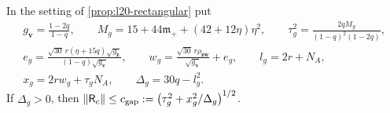 \begin{proposition}\label{prop:l20-pair-gap}
In the setting of \cref{prop:l20-rectangular} put
\begin{gather*}
 g_{\mathbf v}=\frac{1-2q}{1-q},\qquad
 M_g=15+44\mathfrak m_++(42+12\eta)\eta^2,\qquad
 \tau_g^2=\frac{2qM_g}{(1-q)^2(1-2q)},\\
 e_g=\frac{\sqrt{30}\,r(\eta+15q)\sqrt{g_{\mathbf z}}}{(1-q)\sqrt{g_{\mathbf v}}},\qquad
 w_g=\frac{\sqrt{30}\,r\rho_{\mathbf z\mathbf w}}{\sqrt{g_{\mathbf v}}}+e_g,\qquad
 l_g=2r+N_A,\\
 x_g=2rw_g+\tau_gN_A,\qquad\Delta_g=30q-l_g^2 .
\end{gather*}
If $\Delta_g>0$, then
$\left\|\mathsf R_c\right\|\le c_{\rm gap}:=\bigl(\tau_g^2+x_g^2/\Delta_g\bigr)^{1/2}$.
\end{proposition}

